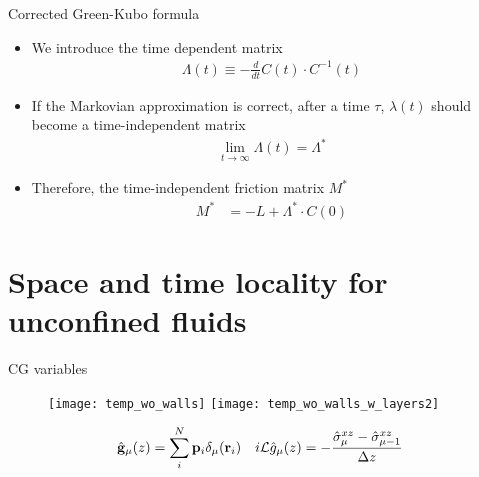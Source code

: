 \documentclass{beamer}
\newcommand{\esc}{\!\cdot\!}
\begin{document}
\begin{frame}{Corrected Green-Kubo formula}
  \begin{itemize}
\item We introduce the time dependent matrix 
\begin{align}
\Lambda(t)\equiv-    \frac{d}{dt}C(t)\esc C^{-1}(t)
\nonumber
\end{align}
\item If the Markovian approximation is correct, after a time $\tau$, $\lambda(t)$ should become a time-independent matrix 
\begin{align}
  \lim_{t\to \infty}\Lambda(t)=\Lambda^*
\nonumber
\end{align}
\item Therefore, the time-independent friction matrix $M^*$
\begin{align}
M^*&=  -L+ \Lambda^*\esc C(0)
\nonumber
\end{align}
\end{itemize}
\end{frame}

\section{Space and time locality for unconfined fluids}
\begin{frame}{CG variables}
\begin{figure}
    \centering
    \texttt{[image: temp\_wo\_walls]}
    \texttt{[image: temp\_wo\_walls\_w\_layers2]}
\end{figure}
\begin{align}
  \hat{\bf g}_\mu(z)= \sum_i^N{\bf p}_i\delta_\mu({\bf r}_i)&& 
  i{\cal L}  \hat{g}_{\mu}(z)=-\frac{\hat{\sigma}^{xz}_{\mu}-\hat{\sigma}^{xz}_{\mu-1}}{\Delta z}
\nonumber
\end{align}
\nonumber
\end{frame}
\end{document}
